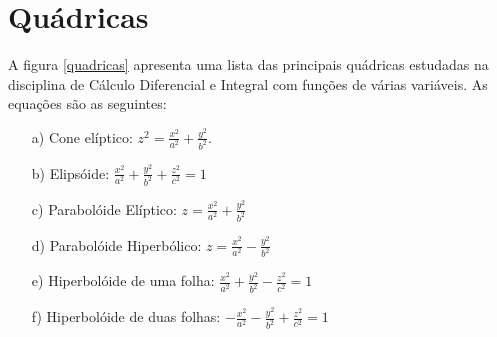 \section{Quádricas}
A figura \ref{quadricas} apresenta uma lista das principais quádricas estudadas na disciplina de Cálculo Diferencial e Integral com funções de várias variáveis. As equações são as seguintes:
\begin{itemize}
\item[a)] Cone elíptico: $\displaystyle z^2=\frac{x^2}{a^2}+\frac{y^2}{b^2}$.
\item[b)] Elipsóide: $\displaystyle \frac{x^2}{a^2}+\frac{y^2}{b^2}+\frac{z^2}{c^2}=1$
\item[c)] Parabolóide Elíptico: $\displaystyle z=\frac{x^2}{a^2}+\frac{y^2}{b^2}$
\item[d)] Parabolóide Hiperbólico: $\displaystyle z=\frac{x^2}{a^2}-\frac{y^2}{b^2}$
\item[e)] Hiperbolóide de uma folha: $\displaystyle \frac{x^2}{a^2}+\frac{y^2}{b^2}-\frac{z^2}{c^2}=1$
\item[f)] Hiperbolóide de duas folhas:  $\displaystyle -\frac{x^2}{a^2}-\frac{y^2}{b^2}+\frac{z^2}{c^2}=1$
\end{itemize}
